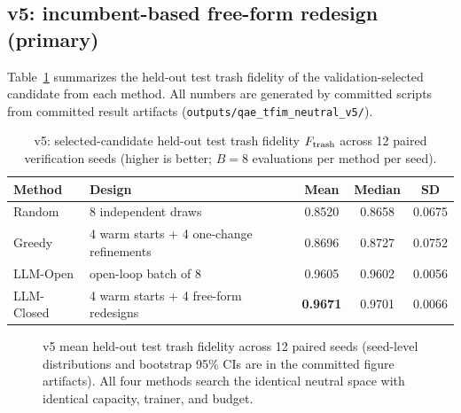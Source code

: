 \documentclass[11pt]{article}
\begin{document}
\subsection{v5: incumbent-based free-form redesign (primary)}

Table~\ref{tab:qae} summarizes the held-out test trash fidelity of the validation-selected candidate from each method.
All numbers are generated by committed scripts from committed result artifacts (\texttt{outputs/qae\_tfim\_neutral\_v5/}).

\begin{table}[ht]
\centering
\caption{v5: selected-candidate held-out test trash fidelity $F_{\rm trash}$ across 12 paired verification seeds (higher is better; $B=8$ evaluations per method per seed).}
\label{tab:qae}
\begin{tabular}{llccc}
\toprule
Method & Design & Mean & Median & SD\\
\midrule
Random & 8 independent draws & 0.8520 & 0.8658 & 0.0675\\
Greedy & 4 warm starts + 4 one-change refinements & 0.8696 & 0.8727 & 0.0752\\
LLM-Open & open-loop batch of 8 & 0.9605 & 0.9602 & 0.0056\\
LLM-Closed & 4 warm starts + 4 free-form redesigns & \textbf{0.9671} & 0.9701 & 0.0066\\
\bottomrule
\end{tabular}
\end{table}

\begin{figure}[ht]
\centering
{}
\caption{v5 mean held-out test trash fidelity across 12 paired seeds (seed-level distributions and bootstrap 95\% CIs are in the committed figure artifacts). All four methods search the identical neutral space with identical capacity, trainer, and budget.}
\label{fig:qae-selected}
\end{figure}
\end{document}
